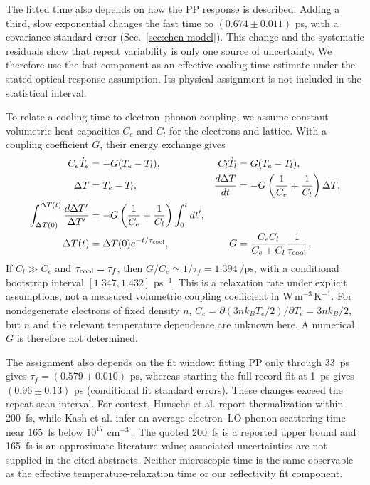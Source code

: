 \documentclass[11pt,a4paper]{article}
\begin{document}
The fitted time also depends on how the PP response is described. Adding a third, slow exponential changes the fast time to $(0.674\pm0.011)$ ps, with a covariance standard error (Sec.~\ref{sec:chen-model}). This change and the systematic residuals show that repeat variability is only one source of uncertainty. We therefore use the fast component as an effective cooling-time estimate under the stated optical-response assumption. Its physical assignment is not included in the statistical interval.

To relate a cooling time to electron--phonon coupling, we assume constant volumetric heat capacities $C_e$ and $C_l$ for the electrons and lattice. With a coupling coefficient $G$, their energy exchange gives
\begin{align}
C_e\dot T_e&=-G(T_e-T_l), & C_l\dot T_l&=G(T_e-T_l),\\
\Delta T&=T_e-T_l, &
\frac{d\Delta T}{dt}&=-G\left(\frac1{C_e}+\frac1{C_l}\right)\Delta T,\\
\int_{\Delta T(0)}^{\Delta T(t)}\frac{d\Delta T'}{\Delta T'}
&=-G\left(\frac1{C_e}+\frac1{C_l}\right)\int_0^t dt',\\
\Delta T(t)&=\Delta T(0)e^{-t/\tau_{\rm cool}}, &
G&=\frac{C_eC_l}{C_e+C_l}\frac1{\tau_{\rm cool}}.
\end{align}
If $C_l\gg C_e$ and $\tau_{\rm cool}=\tau_f$, then $G/C_e\simeq1/\tau_f=\SI{1.394}{\per\pico\second}$, with a conditional bootstrap interval $[1.347,1.432]$ ps$^{-1}$. This is a relaxation rate under explicit assumptions, not a measured volumetric coupling coefficient in W\,m$^{-3}$\,K$^{-1}$. For nondegenerate electrons of fixed density $n$, $C_e=\partial(3nk_BT_e/2)/\partial T_e=3nk_B/2$, but $n$ and the relevant temperature dependence are unknown here. A numerical $G$ is therefore not determined.

The assignment also depends on the fit window: fitting PP only through \SI{33}{ps} gives $\tau_f=(0.579\pm0.010)$ ps, whereas starting the full-record fit at \SI{1}{ps} gives $(0.96\pm0.13)$ ps (conditional fit standard errors). These changes exceed the repeat-scan interval. For context, Hunsche et al. report thermalization within \SI{200}{fs}, while Kash et al. infer an average electron--LO-phonon scattering time near \SI{165}{fs} below $10^{17}$ cm$^{-3}$ \cite{hunsche,kash}. The quoted \SI{200}{fs} is a reported upper bound and \SI{165}{fs} is an approximate literature value; associated uncertainties are not supplied in the cited abstracts. Neither microscopic time is the same observable as the effective temperature-relaxation time or our reflectivity fit component.
\end{document}
